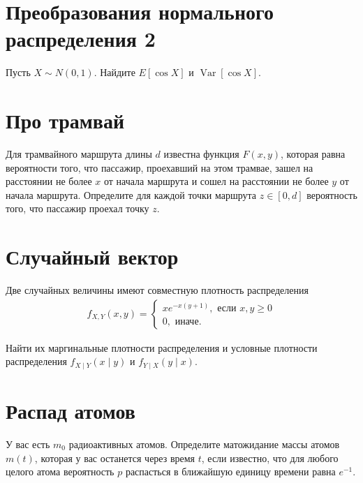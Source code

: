 \documentclass[12pt]{article}
\DeclareMathOperator{\Var}{Var}
\begin{document}
\section{Преобразования нормального распределения 2}

Пусть $X \sim N(0, 1)$. Найдите $E[\cos X]$ и $\Var[\cos X]$.

\section{Про трамвай}

Для трамвайного маршрута длины $d$ известна функция $F(x, y)$, которая равна вероятности того, что пассажир, проехавший на этом трамвае, зашел на расстоянии не более $x$ от начала маршрута и сошел на расстоянии не более $y$ от начала маршрута. Определите для каждой точки маршрута $z \in [0, d]$ вероятность того, что пассажир проехал точку $z$.

\section{Случайный вектор}

Две случайных величины имеют совместную плотность распределения 
\begin{align*}
    f_{X, Y}(x, y) = \begin{cases}
        xe^{-x(y + 1)}, \text{ если } x, y \ge 0 \\
        0, \text{ иначе.}
    \end{cases}
\end{align*}

Найти их маргинальные плотности распределения и условные плотности распределения $f_{X \mid Y}(x \mid y)$ и $f_{Y \mid X}(y \mid x)$.

\section{Распад атомов}

У вас есть $m_0$ радиоактивных атомов. Определите матожидание массы атомов $m(t)$, которая у вас останется через время $t$, если известно, что для любого целого атома вероятность $p$ распасться в ближайшую единицу времени равна $e^{-1}$.  
\end{document}
